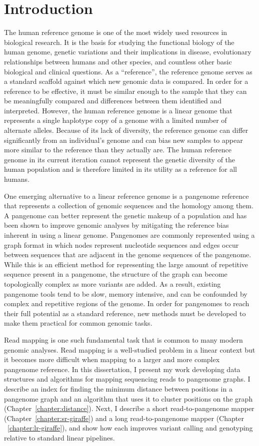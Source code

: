 \documentclass[11pt]{ucscthesis}
\begin{document}
\chapter{Introduction}

The human reference genome is one of the most widely used resources in biological research.
It is the basis for studying the functional biology of the human genome, genetic variations and their implications in disease, evolutionary relationships between humans and other species, and countless other basic biological and clinical questions.
As a ``reference'', the reference genome serves as a standard scaffold against which new genomic data is compared.
In order for a reference to be effective, it must be similar enough to the sample that they can be meaningfully compared and differences between them identified and interpreted.
However, the human reference genome is a linear genome that represents a single haplotype copy of a genome with a limited number of alternate alleles.
Because of its lack of diversity, the reference genome can differ significantly from an individual's genome and can bias new samples to appear more similar to the reference than they actually are.
The human reference genome in its current iteration cannot represent the genetic diversity of the human population and is therefore limited in its utility as a reference for all humans.

One emerging alternative to a linear reference genome is a pangenome reference that represents a collection of genomic sequences and the homology among them.
A pangenome can better represent the genetic makeup of a population and has been shown to improve genomic analyses by mitigating the reference bias inherent in using a linear genome.
Pangenomes are commonly represented using a graph format in which nodes represent nucleotide sequences and edges occur between sequences that are adjacent in the genome sequences of the pangenome.
While this is an efficient method for representing the large amount of repetitive sequence present in a pangenome, the structure of the graph can become topologically complex as more variants are added.
As a result, existing pangenome tools tend to be slow, memory intensive, and can be confounded by complex and repetitive regions of the genome.
In order for pangenomes to reach their full potential as a standard reference, new methods must be developed to make them practical for common genomic tasks.

Read mapping is one such fundamental task that is common to many modern genomic analyses.
Read mapping is a well-studied problem in a linear context but it becomes more difficult when mapping to a larger and more complex pangenome reference.
In this dissertation, I present my work developing data structures and algorithms for mapping sequencing reads to pangenome graphs.
I describe an index for finding the minimum distance between positions in a pangenome graph and an algorithm that uses it to cluster positions on the graph (Chapter~\ref{chapter:distance}).
Next, I describe a short read-to-pangenome mapper (Chapter~\ref{chapter:sr-giraffe}) and a long read-to-pangenome mapper (Chapter ~\ref{chapter:lr-giraffe}), and show how each improves variant calling and genotyping relative to standard linear pipelines.
\end{document}
